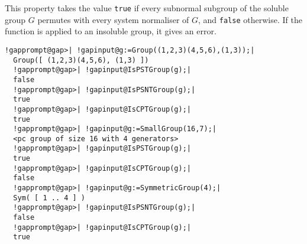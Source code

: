 \documentclass[a4paper,11pt]{report}
\begin{document}
{{{ This property takes the value \texttt{true} if every subnormal subgroup of the soluble group $G$ permutes with every system normaliser of $G$, and \texttt{false} otherwise. If the function is applied to an insoluble group, it gives an
error. 

 
\begin{Verbatim}[commandchars=!@|,fontsize=\small,frame=single,label=Example]
  !gapprompt@gap>| !gapinput@g:=Group((1,2,3)(4,5,6),(1,3));|
  Group([ (1,2,3)(4,5,6), (1,3) ])
  !gapprompt@gap>| !gapinput@IsPSTGroup(g);|
  false
  !gapprompt@gap>| !gapinput@IsPSNTGroup(g);|
  true
  !gapprompt@gap>| !gapinput@IsCPTGroup(g);|
  true
  !gapprompt@gap>| !gapinput@g:=SmallGroup(16,7);|
  <pc group of size 16 with 4 generators>
  !gapprompt@gap>| !gapinput@IsPSTGroup(g);|
  true
  !gapprompt@gap>| !gapinput@IsCPTGroup(g);|
  false
  !gapprompt@gap>| !gapinput@g:=SymmetricGroup(4);|
  Sym( [ 1 .. 4 ] )
  !gapprompt@gap>| !gapinput@IsPSNTGroup(g);|
  false
  !gapprompt@gap>| !gapinput@IsCPTGroup(g);|
  true
\end{Verbatim}
 }

 }

 }

 
\end{document}

